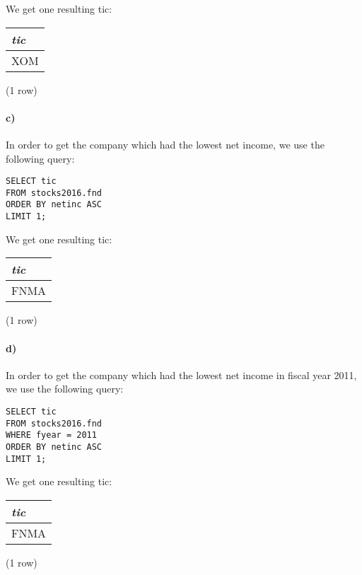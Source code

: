 \documentclass[]{article}
\let\oldparagraph\paragraph
\renewcommand{\paragraph}[1]{\oldparagraph{#1}\mbox{}}
\begin{document}
We get one resulting tic:

\begin{center}
\begin{tabular}{|l|}
\hline
\textit{tic} \\
\hline
XOM \\
\hline
\end{tabular}

\noindent (1 row) \\
\end{center}

\paragraph{c)}
In order to get the company which had the lowest net income, we use the following query:

\color{blue}
\begin{verbatim}
SELECT tic
FROM stocks2016.fnd
ORDER BY netinc ASC
LIMIT 1;
\end{verbatim}
\color{black}

We get one resulting tic:

\begin{center}
\begin{tabular}{|l|}
\hline
\textit{tic} \\
\hline
FNMA \\
\hline
\end{tabular}

\noindent (1 row) \\
\end{center}

\paragraph{d)}
In order to get the company which had the lowest net income in fiscal year 2011, we use the following query:

\color{blue}
\begin{verbatim}
SELECT tic
FROM stocks2016.fnd
WHERE fyear = 2011
ORDER BY netinc ASC
LIMIT 1;
\end{verbatim}
\color{black}

We get one resulting tic:

\begin{center}
\begin{tabular}{|l|}
\hline
\textit{tic} \\
\hline
FNMA \\
\hline
\end{tabular}

\noindent (1 row) \\
\end{center}
\end{document}

